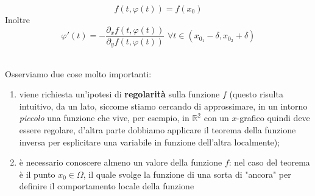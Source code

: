 \documentclass[openany, italian]{book}
\begin{document}
\begin{theorem}
\begin{theorem}
$$
f(t, \varphi(t)) = f(x_0)
$$
Inoltre
$$
\varphi'(t)=-\frac{\partial_x f(t, \varphi(t))}{\partial_y f(t, \varphi(t))} \, \, \forall t \in (x_{0_1} - \delta, x_{0_2} + \delta)
$$
\end{theorem}
\hspace{1cm} \\
Osserviamo due cose molto importanti:
\begin{enumerate}[label=\protect\circled{\arabic*}]
	\item viene richiesta un'ipotesi di \textbf{regolarità} sulla funzione $f$ (questo risulta intuitivo, da un lato, siccome stiamo cercando di approssimare, in un intorno \emph{piccolo} una funzione che vive, per esempio, in $\mathbb{R}^2$ con un $x$-grafico quindi deve essere regolare, d'altra parte dobbiamo applicare il teorema della funzione inversa per esplicitare una variabile in funzione dell'altra localmente);
	\item è necessario conoscere almeno un valore della funzione $f$: nel caso del teorema è il punto $x_0 \in \Omega$, il quale svolge la funzione di una sorta di "ancora" per definire il comportamento locale della funzione
\end{enumerate}
\end{theorem}
\end{document}
